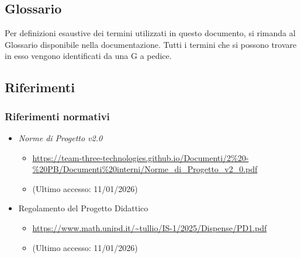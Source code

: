 \documentclass[a4paper,12pt]{article}
\begin{document}
    \subsection{Glossario}
        Per definizioni esaustive dei termini utilizzati in questo documento, si rimanda al Glossario disponibile nella documentazione. Tutti i termini che si possono trovare in esso vengono identificati da una G a pedice.
    \subsection{Riferimenti}
        \subsubsection{Riferimenti normativi}
            \begin{itemize}
                \item \textit{Norme di Progetto v2.0}
                \begin{itemize}
                    \item \url{https://team-three-technologies.github.io/Documenti/2%20-%20PB/Documenti%20interni/Norme_di_Progetto_v2_0.pdf}
                    \item[] (Ultimo accesso: 11/01/2026)
                \end{itemize}
                \item Regolamento del Progetto Didattico
                \begin{itemize}
                    \item \url{https://www.math.unipd.it/~tullio/IS-1/2025/Dispense/PD1.pdf}
                    \item[] (Ultimo accesso: 11/01/2026)
                \end{itemize}
            \end{itemize}
\end{document}
